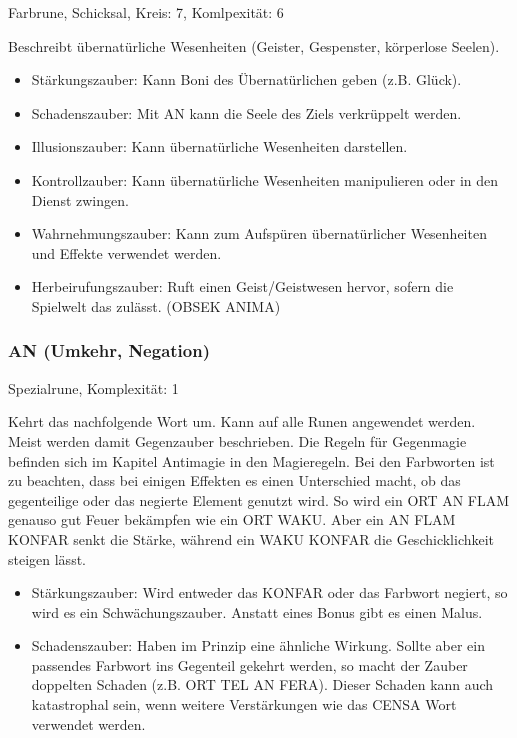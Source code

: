 \documentclass{article}
\begin{document}
Farbrune, Schicksal, Kreis: 7, Komlpexität: 6

Beschreibt übernatürliche Wesenheiten (Geister, Gespenster, körperlose Seelen).

\begin{itemize}
\item Stärkungszauber: Kann Boni des Übernatürlichen geben (z.B. Glück).
\item Schadenszauber: Mit AN kann die Seele des Ziels verkrüppelt werden.
\item Illusionszauber: Kann übernatürliche Wesenheiten darstellen.
\item Kontrollzauber: Kann übernatürliche Wesenheiten manipulieren oder in den Dienst zwingen.
\item Wahrnehmungszauber: Kann zum Aufspüren übernatürlicher Wesenheiten und Effekte verwendet werden.
\item Herbeirufungszauber: Ruft einen Geist/Geistwesen hervor, sofern die Spielwelt das zulässt. (OBSEK ANIMA)
\end{itemize}

\subsubsection{AN (Umkehr, Negation)}

Spezialrune, Komplexität: 1

Kehrt das nachfolgende Wort um. Kann auf alle Runen angewendet werden. Meist werden damit Gegenzauber beschrieben. Die
Regeln für Gegenmagie befinden sich im Kapitel Antimagie in den Magieregeln. Bei den Farbworten ist zu beachten, dass
bei einigen Effekten es einen Unterschied macht, ob das gegenteilige oder das negierte Element genutzt wird.
So wird ein ORT AN FLAM genauso gut Feuer bekämpfen wie ein ORT WAKU. Aber ein AN FLAM KONFAR senkt die Stärke, während
ein WAKU KONFAR die Geschicklichkeit steigen lässt.

\begin{itemize}
\item Stärkungszauber: Wird entweder das KONFAR oder das Farbwort negiert, so wird es ein Schwächungszauber. Anstatt eines Bonus gibt es einen Malus.
\item Schadenszauber: Haben im Prinzip eine ähnliche Wirkung. Sollte aber ein passendes Farbwort ins Gegenteil gekehrt werden, so macht der Zauber doppelten Schaden (z.B. ORT TEL AN FERA). Dieser Schaden kann auch katastrophal sein, wenn weitere Verstärkungen wie das CENSA Wort verwendet werden.
\end{itemize}
\end{document}
